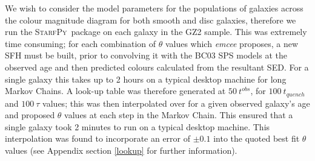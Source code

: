 \documentclass[useAMS,usenatbib]{mn2e}
\def\changed    {\color{titlecol} }
\def\starfpy {\textsc{StarfPy}}
\begin{document}
{\changed We wish to consider the model parameters for the populations of galaxies across the colour magnitude diagram for both smooth and disc galaxies, therefore we run the \starfpy ~package on each galaxy in the GZ2 sample. This was extremely time consuming; for each combination of $\theta$ values which \emph{emcee} proposes, a new SFH must be built, prior to convolving it with the BC03 SPS models at the observed age and then predicted colours calculated from the resultant SED. For a single galaxy this takes up to 2 hours on a typical desktop machine for long Markov Chains. A look-up table was therefore generated at $50 ~t^{obs}$, for $100 ~t_{quench}$ and $100 ~\tau$ values; this was then interpolated over for a given observed galaxy's age and proposed $\theta$ values at each step in the Markov Chain. This ensured that a single galaxy took 2 minutes to run on a typical desktop machine. This interpolation was found to incorporate an error of $\pm 0.1$ into the quoted best fit $\theta$ values (see Appendix section \ref{lookup} for further information). 

}
\end{document}
